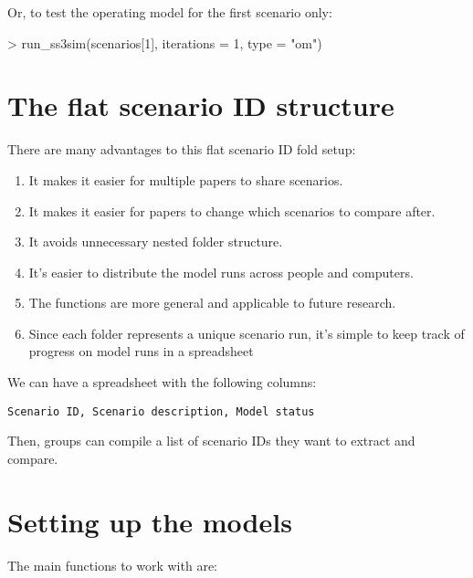 \documentclass[12pt]{article}
\begin{document}
\noindent
Or, to test the operating model for the first scenario only:

\begin{Schunk}
\begin{Sinput}
> run_ss3sim(scenarios[1], iterations = 1, type = "om")
\end{Sinput}
\end{Schunk}

\section*{The flat scenario ID structure}
There are many advantages to this flat scenario ID fold setup:

\begin{enumerate}
  \item It makes it easier for multiple papers to share scenarios.

  \item It makes it easier for papers to change which scenarios to compare after.

  \item It avoids unnecessary nested folder structure.

  \item It's easier to distribute the model runs across people and computers.

  \item The functions are more general and applicable to future research.

  \item Since each folder represents a unique scenario run, it's simple to keep track of progress on model runs in a spreadsheet
  
\end{enumerate}

\noindent
We can have a spreadsheet with the following columns:

\begin{verbatim}
Scenario ID, Scenario description, Model status
\end{verbatim}

\noindent
Then, groups can compile a list of scenario IDs they want to extract and compare.

\section*{Setting up the models}

The main functions to work with are:
\end{document}
